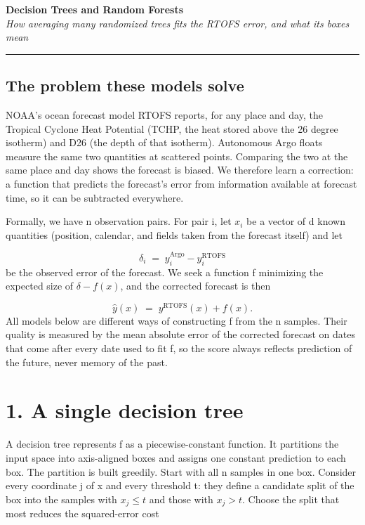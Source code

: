 \documentclass[11pt]{article}
\begin{document}
{\huge\bfseries Decision Trees and Random Forests}\\[2.5mm]
{\large\itshape How averaging many randomized trees fits the RTOFS error, and what its boxes mean}\\[2mm]
\hrule\vspace{5mm}

\subsection*{The problem these models solve}
NOAA's ocean forecast model RTOFS reports, for any place and day, the Tropical Cyclone Heat Potential (TCHP, the heat stored above the 26 degree isotherm) and D26 (the depth of that isotherm). Autonomous Argo floats measure the same two quantities at scattered points. Comparing the two at the same place and day shows the forecast is biased. We therefore learn a correction: a function that predicts the forecast's error from information available at forecast time, so it can be subtracted everywhere.

Formally, we have n observation pairs. For pair i, let $x_i$ be a vector of d known quantities (position, calendar, and fields taken from the forecast itself) and let

\[ \delta_i \;=\; y_i^{\mathrm{Argo}} - y_i^{\mathrm{RTOFS}} \]
be the observed error of the forecast. We seek a function f minimizing the expected size of $\delta-f(x)$, and the corrected forecast is then

\[ \hat{y}(x) \;=\; y^{\mathrm{RTOFS}}(x) + f(x). \]
All models below are different ways of constructing f from the n samples. Their quality is measured by the mean absolute error of the corrected forecast on dates that come after every date used to fit f, so the score always reflects prediction of the future, never memory of the past.

\section*{1. A single decision tree}
A decision tree represents f as a piecewise-constant function. It partitions the input space into axis-aligned boxes and assigns one constant prediction to each box. The partition is built greedily. Start with all n samples in one box. Consider every coordinate j of x and every threshold t: they define a candidate split of the box into the samples with $x_j\le t$ and those with $x_j>t$. Choose the split that most reduces the squared-error cost
\end{document}
